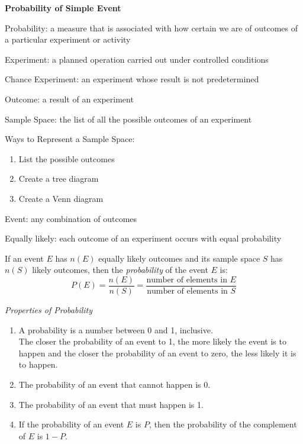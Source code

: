 \begin{center}
\textbf{Probability of Simple Event
}
\end{center}

\vspace*{1ex}

Probability: a measure that is associated with how certain we are of outcomes of a particular experiment or activity

\vspce

Experiment: a planned operation carried out under controlled conditions

\vspce

Chance Experiment: an experiment whose result is not predetermined

\vspce

Outcome: a result of an experiment 

\vspce

Sample Space: the list of all the possible outcomes of an experiment

\vspce

Ways to Represent a Sample Space: 
\begin{enumerate}[label = \arabic*. ]
\item List the possible outcomes
\item Create a tree diagram
\item Create a Venn
diagram

\end{enumerate}  

\vspce

Event: any combination of outcomes

\vspce

Equally likely: each outcome of an experiment occurs with equal probability

\vspce

If an event $E$ has $n(E)$ equally likely outcomes and its sample space $S$ has $n(S)$ likely outcomes, then the \emph{probability} of the event $E$ is: 
\[
P(E) = \displaystyle \frac{n(E) }{n(S)} = \displaystyle \frac{\text{number of elements in } E}{\text{number of elements in }S} 
\] 

\vspace*{1.5ex}

\emph{Properties of Probability} 
\begin{enumerate}[label = \arabic*. ]
\item A probability is a number between 0 and 1, inclusive. \\
The closer the probability of an event to 1, the more likely the event is to happen and the closer the probability of an event to zero, the less likely it is to happen.
\item The probability of an event that cannot happen is 0.
\item The probability of an event that must happen is 1.
\item If the probability of an event $E$ is $P$, then the probability of the complement of $E$ is $1-P$.

\end{enumerate} 


